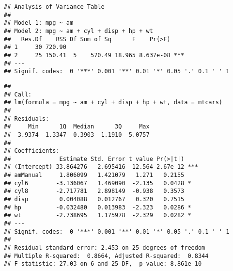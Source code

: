 \documentclass[]{article}
\newenvironment{Shaded}{\begin{snugshade}}{\end{snugshade}}
\newcommand{\KeywordTok}[1]{\textcolor[rgb]{0.13,0.29,0.53}{\textbf{#1}}}
\newcommand{\CommentTok}[1]{\textcolor[rgb]{0.56,0.35,0.01}{\textit{#1}}}
\newcommand{\NormalTok}[1]{#1}
\begin{document}
\begin{verbatim}
## Analysis of Variance Table
## 
## Model 1: mpg ~ am
## Model 2: mpg ~ am + cyl + disp + hp + wt
##   Res.Df    RSS Df Sum of Sq      F    Pr(>F)    
## 1     30 720.90                                  
## 2     25 150.41  5    570.49 18.965 8.637e-08 ***
## ---
## Signif. codes:  0 '***' 0.001 '**' 0.01 '*' 0.05 '.' 0.1 ' ' 1
\end{verbatim}

\begin{Shaded}
\end{Shaded}

\begin{verbatim}
## 
## Call:
## lm(formula = mpg ~ am + cyl + disp + hp + wt, data = mtcars)
## 
## Residuals:
##     Min      1Q  Median      3Q     Max 
## -3.9374 -1.3347 -0.3903  1.1910  5.0757 
## 
## Coefficients:
##              Estimate Std. Error t value Pr(>|t|)    
## (Intercept) 33.864276   2.695416  12.564 2.67e-12 ***
## amManual     1.806099   1.421079   1.271   0.2155    
## cyl6        -3.136067   1.469090  -2.135   0.0428 *  
## cyl8        -2.717781   2.898149  -0.938   0.3573    
## disp         0.004088   0.012767   0.320   0.7515    
## hp          -0.032480   0.013983  -2.323   0.0286 *  
## wt          -2.738695   1.175978  -2.329   0.0282 *  
## ---
## Signif. codes:  0 '***' 0.001 '**' 0.01 '*' 0.05 '.' 0.1 ' ' 1
## 
## Residual standard error: 2.453 on 25 degrees of freedom
## Multiple R-squared:  0.8664, Adjusted R-squared:  0.8344 
## F-statistic: 27.03 on 6 and 25 DF,  p-value: 8.861e-10
\end{verbatim}
\end{document}
